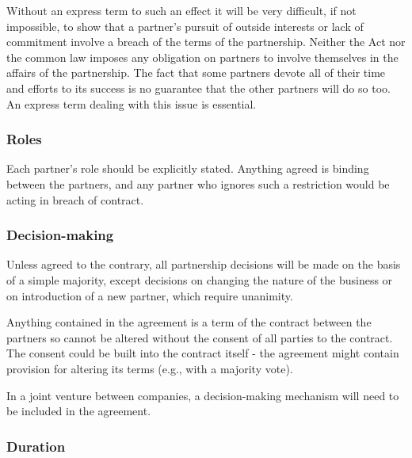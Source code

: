 \documentclass[
]{article}
\newenvironment{Shaded}{}{}
\newcommand{\NormalTok}[1]{#1}
\begin{document}
Without an express term to such an effect it will be very difficult, if
not impossible, to show that a partner's pursuit of outside interests or
lack of commitment involve a breach of the terms of the partnership.
Neither the Act nor the common law imposes any obligation on partners to
involve themselves in the affairs of the partnership. The fact that some
partners devote all of their time and efforts to its success is no
guarantee that the other partners will do so too. An express term
dealing with this issue is essential.

\hypertarget{roles}{%
\subsubsection{Roles}\label{roles}}

Each partner's role should be explicitly stated. Anything agreed is
binding between the partners, and any partner who ignores such a
restriction would be acting in breach of contract.

\hypertarget{decision-making}{%
\subsubsection{Decision-making}\label{decision-making}}

Unless agreed to the contrary, all partnership decisions will be made on
the basis of a simple majority, except decisions on changing the nature
of the business or on introduction of a new partner, which require
unanimity.

\begin{Shaded}
\begin{Highlighting}[]
\NormalTok{Anything contained in the agreement is a term of the contract between the partners so cannot be altered without the consent of all parties to the contract. The consent could be built into the contract itself {-} the agreement might contain provision for altering its terms (e.g., with a majority vote).}
\end{Highlighting}
\end{Shaded}

In a joint venture between companies, a decision-making mechanism will
need to be included in the agreement.

\hypertarget{duration}{%
\subsubsection{Duration}\label{duration}}
\end{document}
